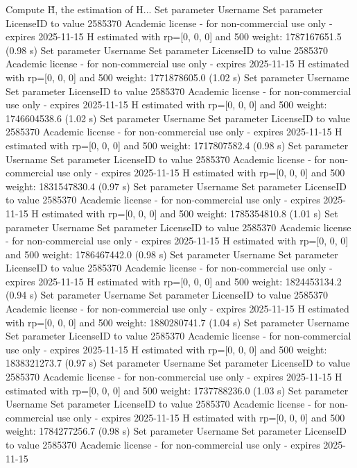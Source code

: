 Compute H̃, the estimation of H...
Set parameter Username
Set parameter LicenseID to value 2585370
Academic license - for non-commercial use only - expires 2025-11-15
  H estimated with rp=[0, 0, 0] and 500 weight:  1787167651.5  (0.98 s)
Set parameter Username
Set parameter LicenseID to value 2585370
Academic license - for non-commercial use only - expires 2025-11-15
  H estimated with rp=[0, 0, 0] and 500 weight:  1771878605.0  (1.02 s)
Set parameter Username
Set parameter LicenseID to value 2585370
Academic license - for non-commercial use only - expires 2025-11-15
  H estimated with rp=[0, 0, 0] and 500 weight:  1746604538.6  (1.02 s)
Set parameter Username
Set parameter LicenseID to value 2585370
Academic license - for non-commercial use only - expires 2025-11-15
  H estimated with rp=[0, 0, 0] and 500 weight:  1717807582.4  (0.98 s)
Set parameter Username
Set parameter LicenseID to value 2585370
Academic license - for non-commercial use only - expires 2025-11-15
  H estimated with rp=[0, 0, 0] and 500 weight:  1831547830.4  (0.97 s)
Set parameter Username
Set parameter LicenseID to value 2585370
Academic license - for non-commercial use only - expires 2025-11-15
  H estimated with rp=[0, 0, 0] and 500 weight:  1785354810.8  (1.01 s)
Set parameter Username
Set parameter LicenseID to value 2585370
Academic license - for non-commercial use only - expires 2025-11-15
  H estimated with rp=[0, 0, 0] and 500 weight:  1786467442.0  (0.98 s)
Set parameter Username
Set parameter LicenseID to value 2585370
Academic license - for non-commercial use only - expires 2025-11-15
  H estimated with rp=[0, 0, 0] and 500 weight:  1824453134.2  (0.94 s)
Set parameter Username
Set parameter LicenseID to value 2585370
Academic license - for non-commercial use only - expires 2025-11-15
  H estimated with rp=[0, 0, 0] and 500 weight:  1880280741.7  (1.04 s)
Set parameter Username
Set parameter LicenseID to value 2585370
Academic license - for non-commercial use only - expires 2025-11-15
  H estimated with rp=[0, 0, 0] and 500 weight:  1838321273.7  (0.97 s)
Set parameter Username
Set parameter LicenseID to value 2585370
Academic license - for non-commercial use only - expires 2025-11-15
  H estimated with rp=[0, 0, 0] and 500 weight:  1737788236.0  (1.03 s)
Set parameter Username
Set parameter LicenseID to value 2585370
Academic license - for non-commercial use only - expires 2025-11-15
  H estimated with rp=[0, 0, 0] and 500 weight:  1784277256.7  (0.98 s)
Set parameter Username
Set parameter LicenseID to value 2585370
Academic license - for non-commercial use only - expires 2025-11-15
